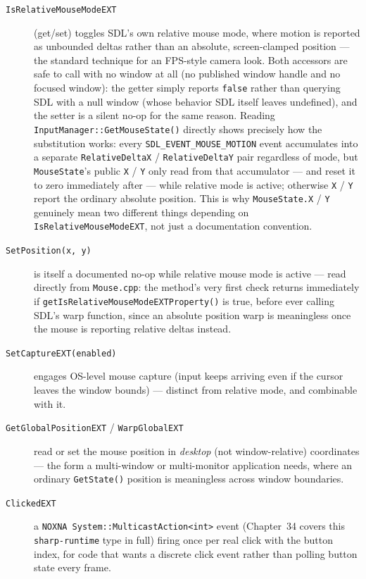 \begin{description}
\item[\texttt{IsRelativeMouseModeEXT}] (get/set)
  toggles SDL's own relative mouse mode, where motion is reported as unbounded deltas rather
  than an absolute, screen-clamped position --- the standard technique for an FPS-style camera
  look. Both accessors are safe to call with no window at all (no published window handle and
  no focused window): the getter simply reports \texttt{false} rather than querying SDL with a
  null window (whose behavior SDL itself leaves undefined), and the setter is a silent no-op
  for the same reason. Reading \texttt{InputManager::GetMouseState()} directly shows precisely
  how the substitution works: every \texttt{SDL\_EVENT\_MOUSE\_MOTION} event accumulates into
  a separate \texttt{RelativeDeltaX} / \texttt{RelativeDeltaY} pair regardless of mode, but
  \texttt{MouseState}'s public \texttt{X} / \texttt{Y} only read from that accumulator --- and
  reset it to zero immediately after --- while relative mode is active; otherwise \texttt{X} /
  \texttt{Y} report the ordinary absolute position. This is why \texttt{MouseState.X} / \texttt{Y}
  genuinely mean two different things depending on \texttt{IsRelativeMouseModeEXT}, not just a
  documentation convention.
\item[\texttt{SetPosition(x, y)}] is itself a documented no-op while relative mouse mode is
  active --- read directly from \texttt{Mouse.cpp}: the method's very first check returns
  immediately if \texttt{getIsRelativeMouseModeEXTProperty()} is true, before ever calling
  SDL's warp function, since an absolute position warp is meaningless once the mouse is
  reporting relative deltas instead.
\item[\texttt{SetCaptureEXT(enabled)}] engages OS-level mouse capture (input keeps arriving
  even if the cursor leaves the window bounds) --- distinct from relative mode, and combinable
  with it.
\item[\texttt{GetGlobalPositionEXT} / \texttt{WarpGlobalEXT}] read or set the mouse position in
  \emph{desktop} (not window-relative) coordinates --- the form a multi-window or
  multi-monitor application needs, where an ordinary \texttt{GetState()} position is
  meaningless across window boundaries.
\item[\texttt{ClickedEXT}] a \texttt{NOXNA System::MulticastAction<int>} event (Chapter~34
  covers this \texttt{sharp-runtime} type in full) firing once per real click with the button
  index, for code that wants a discrete click event rather than polling button state every
  frame.
\end{description}

